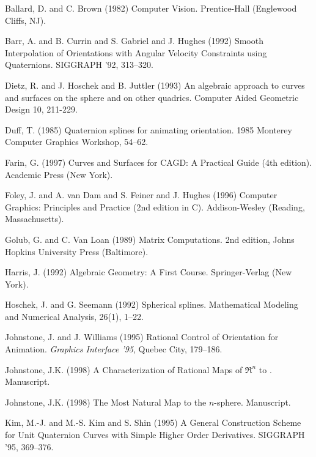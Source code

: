 
\begin{thebibliography}{Lozano-Perez 83}

Ballard, D. and C. Brown (1982)
Computer Vision.
Prentice-Hall (Englewood Cliffs, NJ).

Barr, A. and B. Currin and S. Gabriel and J. Hughes (1992)
Smooth Interpolation of Orientations with Angular Velocity Constraints
using Quaternions.
SIGGRAPH '92, 313--320.

Dietz, R. and J. Hoschek and B. Juttler (1993)
An algebraic approach to curves and surfaces on the sphere and
on other quadrics.
Computer Aided Geometric Design 10, 211-229.

Duff, T. (1985)
Quaternion splines for animating orientation.
1985 Monterey Computer Graphics Workshop, 54--62.

Farin, G. (1997)
Curves and Surfaces for CAGD: A Practical Guide (4th edition).
Academic Press (New York).

Foley, J. and A. van Dam and S. Feiner and J. Hughes (1996)
Computer Graphics: Principles and Practice (2nd edition in C).
Addison-Wesley (Reading, Massachusetts).

Golub, G. and C. Van Loan (1989)
Matrix Computations.
2nd edition, Johns Hopkins University Press (Baltimore).

Harris, J. (1992)
Algebraic Geometry: A First Course.
Springer-Verlag (New York).

Hoschek, J. and G. Seemann (1992)
Spherical splines.
Mathematical Modeling and Numerical Analysis, 26(1), 1--22.

Johnstone, J. and J. Williams (1995)
Rational Control of Orientation for Animation.
{\em Graphics Interface '95}, Quebec City, 179--186.

Johnstone, J.K. (1998)
A Characterization of Rational Maps of $\Re^n$ to .
Manuscript.

Johnstone, J.K. (1998)
The Most Natural Map to the $n$-sphere.
Manuscript.

Kim, M.-J. and M.-S. Kim and S. Shin (1995)
A General Construction Scheme for Unit Quaternion Curves
with Simple Higher Order Derivatives.
SIGGRAPH '95, 369--376.


\end{thebibliography}

